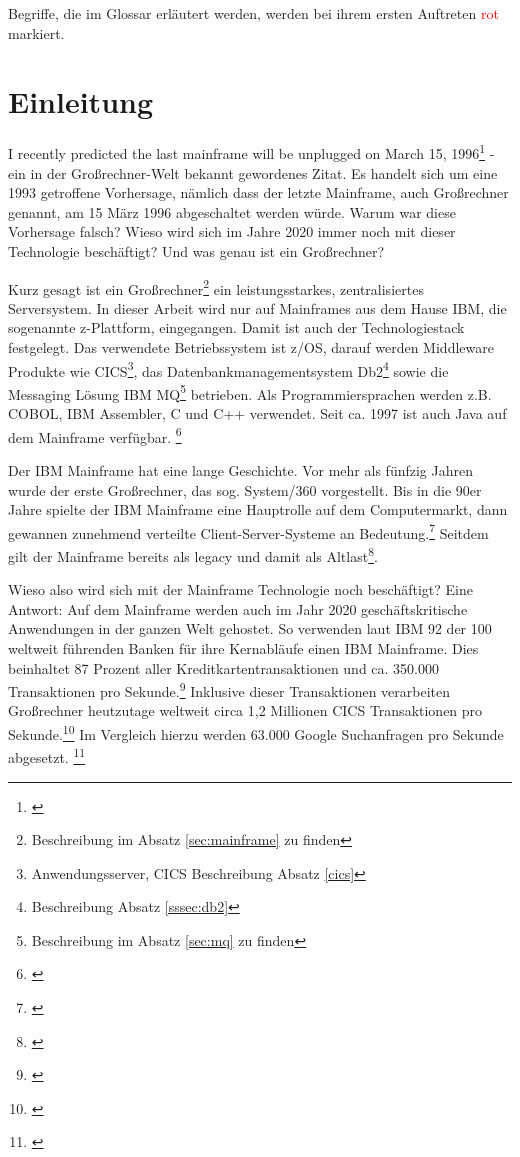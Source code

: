 Begriffe, die im Glossar erläutert werden, werden bei ihrem ersten Auftreten \textcolor{red}{rot} markiert.

\chapter{Einleitung}\label{ch:einleitung}
\glqq I recently predicted the last mainframe will be unplugged on March 15, 1996\grqq\footnote{\cite[S. 4]{Alsop.1993}} - ein in der Großrechner-Welt bekannt gewordenes Zitat.
Es handelt sich um eine 1993 getroffene Vorhersage, nämlich dass der letzte Mainframe, auch Großrechner genannt, am 15 März 1996 abgeschaltet werden würde.
Warum war diese Vorhersage falsch? 
Wieso wird sich im Jahre 2020 immer noch mit dieser Technologie beschäftigt? 
Und was genau ist ein Großrechner?

Kurz gesagt ist ein Großrechner\footnote{Beschreibung im Absatz \ref{sec:mainframe} zu finden} ein leistungsstarkes, zentralisiertes Serversystem.
In dieser Arbeit wird nur auf Mainframes aus dem Hause IBM, die sogenannte z-Plattform, eingegangen.
Damit ist auch der Technologiestack festgelegt.
Das verwendete Betriebssystem ist z/OS, darauf werden Middleware Produkte wie CICS\footnote{Anwendungsserver, CICS Beschreibung Absatz \ref{cics}}, das Datenbankmanagementsystem Db2\footnote{ Beschreibung Absatz \ref{sssec:db2}} sowie die Messaging Lösung \glqq IBM MQ\grqq{}\footnote{Beschreibung im Absatz \ref{sec:mq} zu finden} betrieben.
Als Programmiersprachen werden z.B. COBOL, IBM Assembler, C und C++ verwendet. 
Seit ca. 1997 ist auch Java auf dem Mainframe verfügbar. \footnote{\cite[S. 6]{Steegmans.2003}}

Der IBM Mainframe hat eine lange Geschichte.
Vor mehr als fünfzig Jahren wurde der erste Großrechner, das sog. \glqq System/360\grqq{} vorgestellt.
Bis in die 90er Jahre spielte der IBM Mainframe eine Hauptrolle auf dem Computermarkt, dann gewannen zunehmend verteilte Client-Server-Systeme an Bedeutung.\footnote{\cite[Kap. 5]{Ceruzzi.2003}}
Seitdem gilt der Mainframe bereits als \glqq  legacy\grqq{} und damit als \glqq Altlast\grqq\footnote{\cite{.22.2.2020}}.

Wieso also wird sich mit der Mainframe Technologie noch beschäftigt? Eine Antwort: Auf dem Mainframe werden auch im Jahr 2020 geschäftskritische Anwendungen in der ganzen Welt gehostet.
So verwenden laut IBM 92 der 100 weltweit führenden Banken für ihre Kernabläufe einen IBM Mainframe.
Dies beinhaltet 87 Prozent aller Kreditkartentransaktionen und ca. 350.000 Transaktionen pro Sekunde.\footnote{\cite{.25.2.2020c}}
Inklusive dieser Transaktionen verarbeiten Großrechner heutzutage weltweit circa 1,2 Millionen CICS Transaktionen pro Sekunde.\footnote{\cite{.23.11.2019b}}
Im Vergleich hierzu werden 63.000 Google Suchanfragen pro Sekunde abgesetzt.  \footnote{\cite{.02.12.2019}}

